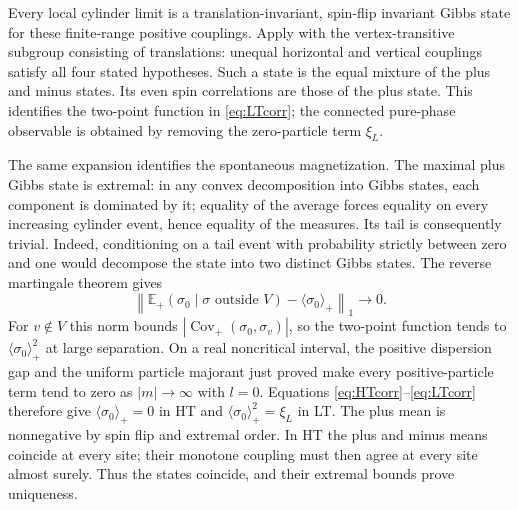 \documentclass[11pt]{article}
\numberwithin{equation}{section}
\theoremstyle{definition}
\begin{document}
Every local cylinder limit is a translation-invariant, spin-flip invariant
Gibbs state for these finite-range positive couplings. Apply
\cite[Theorem 1]{Raoufi} with the vertex-transitive subgroup consisting
of translations: unequal horizontal and vertical couplings satisfy all
four stated hypotheses. Such a state is the equal mixture of the plus
and minus states. Its even spin correlations are those of the plus
state. This identifies the two-point function in \eqref{eq:LTcorr};
the connected pure-phase observable is obtained by removing the
zero-particle term $\xi_L$.

The same expansion identifies the spontaneous magnetization.
The maximal plus Gibbs state is extremal: in any convex
decomposition into Gibbs states, each component is dominated by it;
equality of the average forces equality on every increasing cylinder
event, hence equality of the measures.  Its tail is consequently
trivial. Indeed, conditioning on a tail event with probability
strictly between zero and one would decompose the state into two
distinct Gibbs states. The reverse martingale theorem gives
\[
 \left\|\mathbb E_+(\sigma_0\mid
          \sigma\text{ outside }V)-\langle\sigma_0\rangle_+\right\|_1
       \longrightarrow0.
\]
For $v\notin V$ this norm bounds
$|\operatorname{Cov}_+(\sigma_0,\sigma_v)|$, so the two-point
function tends to $\langle\sigma_0\rangle_+^2$ at large separation.
On a real noncritical interval, the positive dispersion gap and the
uniform particle majorant just proved make every positive-particle
term tend to zero as $|m|\to\infty$ with $l=0$.
Equations \eqref{eq:HTcorr}--\eqref{eq:LTcorr} therefore give
$\langle\sigma_0\rangle_+=0$ in HT and
$\langle\sigma_0\rangle_+^2=\xi_L$ in LT.  The plus mean is
nonnegative by spin flip and extremal order.  In HT the plus and
minus means coincide at every site; their monotone coupling must
then agree at every site almost surely.  Thus the states coincide,
and their extremal bounds prove uniqueness.
\end{document}
